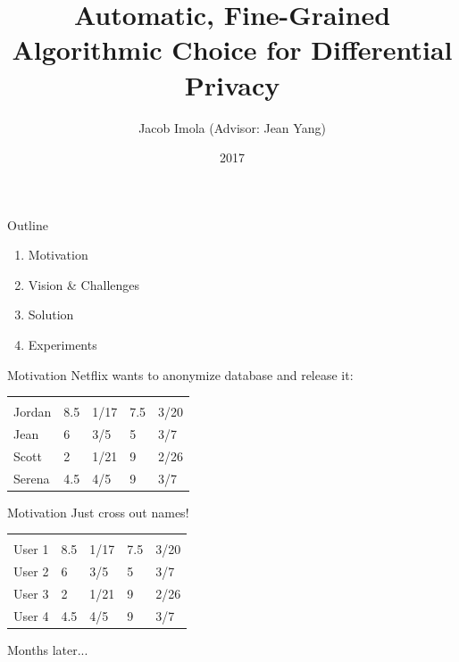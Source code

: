 \documentclass{beamer}
\title{Automatic, Fine-Grained Algorithmic Choice for Differential Privacy}
\author{Jacob Imola (Advisor: Jean Yang)}
\institute{Carnegie Mellon University}
\date{2017}
\newcommand{\NonPrivateNetflix}{\begin{tabular}{lllll}
\; & \rotatebox[origin=r]{270}{Titanic} & \rotatebox[origin=r]{270}{Date} & \rotatebox[origin=r]{270}{The Notebook} & \rotatebox[origin=r]{270}{Date} \\
Jordan & 8.5 & 1/17 & 7.5 & 3/20 \\
Jean & 6 & 3/5 & 5 & 3/7 \\
Scott & 2 & 1/21 & 9 & 2/26 \\
Serena & 4.5 & 4/5 & 9 & 3/7 \\
\end{tabular}}
\newcommand{\PrivateNetflix}{\begin{tabular}{lllll}
\; & \rotatebox[origin=r]{270}{Titanic} & \rotatebox[origin=r]{270}{Date} & \rotatebox[origin=r]{270}{The Notebook} & \rotatebox[origin=r]{270}{Date} \\
User 1 & 8.5 & 1/17 & 7.5 & 3/20 \\
User 2 & 6 & 3/5 & 5 & 3/7 \\
User 3 & 2 & 1/21 & 9 & 2/26 \\
User 4 & 4.5 & 4/5 & 9 & 3/7 \\
\end{tabular}}
\begin{document}
\frame{\titlepage}
\begin{frame}{Outline}
\begin{enumerate}
\item Motivation
\item Vision \& Challenges
\item Solution
\item Experiments
\end{enumerate}
\end{frame}

\begin{frame}{Motivation}
Netflix wants to anonymize database and release it:
\begin{center}
\NonPrivateNetflix
\end{center}
\end{frame}

\begin{frame}{Motivation}
Just cross out names!
\begin{center}
\PrivateNetflix
\end{center}
Months later...
\end{frame}
\end{document}
